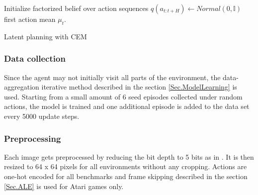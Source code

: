 \begin{algorithm}[H]
\vspace{1cm}
Initialize factorized belief over action sequences $q(a_{t:t+H}) \leftarrow Normal(0, \mathbb I)$\\
\Return first action mean $\mu_t$.
\vspace{0.5cm}
\caption{Latent planning with CEM \cite{Algo.PlaNet}}
\label{Algo.CEMinPlaNet}
\end{algorithm}

\subsubsection{Data collection}

Since the agent may not initially visit all parts of the environment, the data-aggregation iterative method described in the section \ref{Sec.ModelLearning} is used. Starting from a small amount of 6 seed episodes collected under random actions, the model is trained and one additional episode is added to the data set every 5000 update steps.

\subsubsection{Preprocessing}

Each image gets preprocessed by reducing the bit depth to 5 bits as in \cite{Algo.Glow5bit}. It is then resized to 64 x 64 pixels for all environments without any cropping.
Actions are one-hot encoded for all benchmarks and frame skipping described in the section \ref{Sec.ALE} is used for Atari games only.

